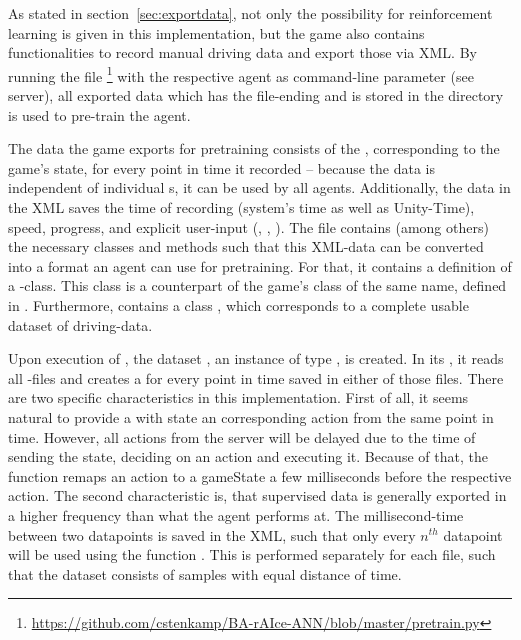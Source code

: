As stated in section~\ref{sec:exportdata}, not only the possibility for reinforcement learning is given in this implementation, but the game also contains functionalities to record manual driving data and export those via XML. By running the file \footnote{\url{https://github.com/cstenkamp/BA-rAIce-ANN/blob/master/pretrain.py}} with the respective agent as command-line parameter (see server), all exported data which has the file-ending  and is stored in the directory  is used to pre-train the agent.

The data the game exports for pretraining consists of the , corresponding to the game's state, for every point in time it recorded -- because the data is independent of individual s, it can be used by all agents. Additionally, the data in the XML saves the time of recording (system's time as well as Unity-Time), speed, progress, and explicit user-input (, , ). The file  contains (among others) the necessary classes and methods such that this XML-data can be converted into a format an agent can use for pretraining. For that, it contains a definition of a -class. This class is a counterpart of the game's class of the same name, defined in . Furthermore,  contains a class , which corresponds to a complete usable dataset of driving-data.

Upon execution of , the dataset , an instance of type , is created. In its , it reads all -files and creates a  for every point in time saved in either of those files. There are two specific characteristics in this implementation. First of all, it seems natural to provide a  with state an corresponding action from the same point in time. However, all actions from the server will be delayed due to the time of sending the state, deciding on an action and executing it. Because of that, the function  remaps an action to a gameState a few milliseconds before the respective action. The second characteristic is, that supervised data is generally exported in a higher frequency than what the agent performs at. The millisecond-time between two datapoints is saved in the XML, such that only every $n^{th}$ datapoint will be used using the function . This is performed separately for each file, such that the dataset consists of samples with equal distance of time. 

